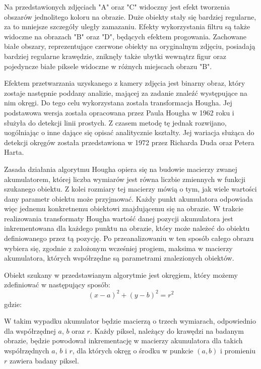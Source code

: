 Na przedstawionych zdjęciach "A" oraz "C" widoczny jest efekt tworzenia obszarów jednolitego koloru na obrazie. Duże obiekty stały się bardziej regularne, za to mniejsze szczegóły uległy zamazaniu. Efekty wykorzystania filtru są także widoczne na obrazach "B" oraz "D", będących efektem progowania. Zachowane białe obszary, reprezentujące czerwone obiekty na oryginalnym zdjęciu, posiadają bardziej regularne krawędzie, zniknęły także ubytki wewnątrz figur oraz pojedyncze białe piksele widoczne w różnych miejscach obrazu "B".

Efektem przetwarzania uzyskanego z kamery zdjęcia jest binarny obraz, który zostaje następnie poddany analizie, mającej za zadanie znaleźć występujące na nim okręgi. Do tego celu wykorzystana została transformacja Hougha. Jej podstawowa wersja została opracowana przez Paula Hougha w 1962 roku i służyła do detekcji linii prostych. Z czasem metodę tę jednak rozwijano, uogólniając o inne dające się opisać analitycznie kształty. Jej wariacja służąca do detekcji okręgów została przedstawiona w 1972 przez Richarda Duda oraz Petera Harta.

Zasada działania algorytmu Hougha opiera się na budowie macierzy zwanej akumulatorem, której liczba wymiarów jest równa liczbie zmiennych w funkcji szukanego obiektu. Z kolei rozmiary tej macierzy mówią o tym, jak wiele wartości dany parametr obiektu może przyjmować. Każdy punkt akumulatora odpowiada więc jednemu konkretnemu obiektowi znajdującemu się na obrazie. W trakcie realizowania transformaty Hougha wartość danej pozycji akumulatora jest inkrementowana dla każdego punktu na obrazie, który może należeć do obiektu definiowanego przez tą pozycję. Po przeanalizowaniu w ten sposób całego obrazu wybiera się, zgodnie z założonym wcześniej progiem, maksima w macierzy akumulatora, których współrzędne są parametrami znalezionych obiektów\cite{Sonka}.

Obiekt szukany w przedstawianym algorytmie jest okręgiem, który możemy zdefiniować w następujący sposób:
\begin{equation}
(x - a)^2 + (y - b)^2 = r^2
\label{eq:kolo}
\end{equation}
gdzie:
\begin{equationDescriptor}
\end{equationDescriptor}
W takim wypadku akumulator będzie macierzą o trzech wymiarach, odpowiednio dla współrzędnej $a$, $b$ oraz $r$. Każdy piksel, należący do krawędzi na badanym obrazie, będzie powodował inkrementację w macierzy akumulatora dla takich współrzędnych $a$, $b$ i $r$, dla których okręg o środku w punkcie $(a, b)$ i promieniu $r$ zawiera badany piksel.

